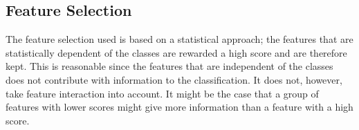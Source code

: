 \subsection{Feature Selection}
The feature selection used is based on a statistical approach; the features that are statistically dependent of the classes are rewarded a high score and are therefore kept. This is reasonable since the features that are independent of the classes does not contribute with information to the classification. It does not, however, take feature interaction into account. It might be the case that a group of features with lower scores might give more information than a feature with a high score. 

